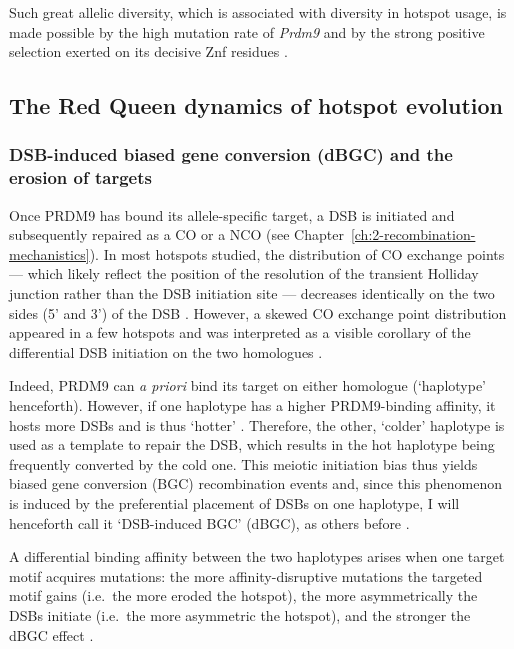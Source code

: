 Such great allelic diversity, which is associated with diversity in hotspot usage, is made possible by the high mutation rate of \textit{Prdm9} \citep{jeffreys2013recombination} and by the strong positive selection exerted on its decisive Znf residues \citep{oliver2009accelerated,thomas2009extraordinary,ponting2011what}.




\subsection{The Red Queen dynamics of hotspot evolution}

\subsubsection{DSB-induced biased gene conversion (dBGC) and the erosion of targets}

Once PRDM9 has bound its allele-specific target, a DSB is initiated and subsequently repaired as a CO or a NCO (see Chapter~\ref{ch:2-recombination-mechanistics}).
In most hotspots studied, the distribution of CO exchange points — which likely reflect the position of the resolution of the transient Holliday junction rather than the DSB initiation site \citep{smith2001homologous} — decreases identically on the two sides (5’ and 3’) of the DSB \citep{arnheim2007mammalian}.
However, a skewed CO exchange point distribution appeared in a few hotspots \citep{jeffreys2002reciprocal,jeffreys2005factors,yauk2003highresolution,neumann2006polymorphism} and was interpreted as a visible corollary of the differential DSB initiation on the two homologues \citep{baudat2007cis}.

Indeed, PRDM9 can \textit{a priori} bind its target on either homologue (‘haplotype’ henceforth). 
However, if one haplotype has a higher PRDM9-binding affinity, it hosts more DSBs and is thus ‘hotter’ \citep{zelazowski2016marks}.
Therefore, the other, ‘colder’ haplotype is used as a template to repair the DSB, which results in the hot haplotype being frequently converted by the cold one. 
This meiotic initiation bias thus yields biased gene conversion (BGC) recombination events and, since this phenomenon is induced by the preferential placement of DSBs on one haplotype, I will henceforth call it ‘DSB-induced BGC’ (dBGC), as others before \citep{lesecque2014conversion, grey2018prdm9}.

A differential binding affinity between the two haplotypes arises when one target motif acquires mutations:
the more affinity-disruptive mutations the targeted motif gains (i.e.\ the more eroded the hotspot), the more asymmetrically the DSBs initiate (i.e.\ the more asymmetric the hotspot), and the stronger the dBGC effect \citep[reviewed in][]{tiemann-boege2017consequences}.



